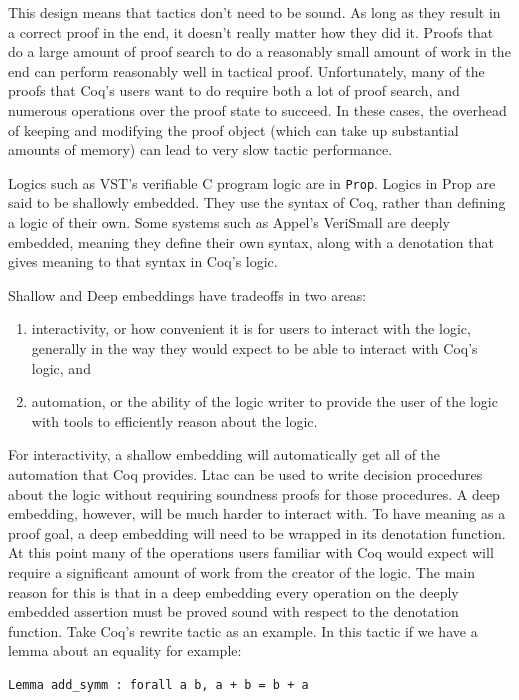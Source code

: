 \documentclass{puthesis}
\begin{document}
This design means that tactics don't need to be sound. As long as they
result in a correct proof in the end, it doesn't really matter how
they did it. Proofs that do a large amount of proof search to do a
reasonably small amount of work in the end can perform reasonably well
in tactical proof. Unfortunately, many of the proofs that Coq's users
want to do require both a lot of proof search, and numerous operations
over the proof state to succeed. In these cases, the overhead of
keeping and modifying the proof object (which can take up substantial
amounts of memory) can lead to very slow tactic performance.

Logics such as VST's verifiable C program logic are in
\lstinline|Prop|. Logics in Prop are said to be shallowly
embedded. They use the syntax of Coq, rather than defining a logic of
their own. Some systems such as Appel's VeriSmall \cite{} are deeply
embedded, meaning they define their own syntax, along with a
denotation that gives meaning to that syntax in Coq's logic. 

Shallow and Deep embeddings have tradeoffs in two areas:

\begin{enumerate}
\item interactivity, or how convenient it is for users to interact
  with the logic, generally in the way they would expect to be able to
  interact with Coq's logic, and
\item automation, or the ability of the logic writer to provide the
  user of the logic with tools to efficiently reason about the logic.
\end{enumerate}

For interactivity, a shallow embedding will automatically get all of
the automation that Coq provides. Ltac can be used to write decision
procedures about the logic without requiring soundness proofs for
those procedures. A deep embedding, however, will be much harder to
interact with. To have meaning as a proof goal, a deep embedding will
need to be wrapped in its denotation function. At this point many of
the operations users familiar with Coq would expect will require a
significant amount of work from the creator of the logic. The main
reason for this is that in a deep embedding every operation on the
deeply embedded assertion must be proved sound with respect to the
denotation function. Take Coq's rewrite tactic as an example. In this
tactic if we have a lemma about an equality for example:

\begin{lstlisting}
Lemma add_symm : forall a b, a + b = b + a
\end{lstlisting}
\end{document}
